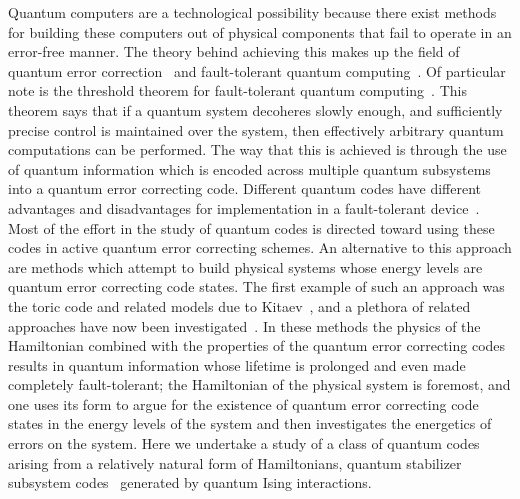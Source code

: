 \documentclass[twocolumn,showpacs,preprintnumbers,amsmath,amssymb,nofootinbib,pra,floatfix]{revtex4-1}
\begin{document}
Quantum computers are a technological possibility because there exist methods for building these computers out of physical components that fail to operate in an error-free manner.  The theory behind achieving this makes up the field of quantum error correction~\cite{Shor:95a,Steane:96a,Steane:96b,Steane:96c,Knill:97a,Gottesman:97a} and fault-tolerant quantum computing~\cite{Shor:96a,Aharonov:97a,Knill:98a,Knill:98b,Preskill:98a,Aliferis:05a}. Of particular note is the threshold theorem for fault-tolerant quantum computing~\cite{Aharonov:97a,Knill:98a,Knill:98b,Aliferis:05a}.  This theorem says that if a quantum system decoheres slowly enough, and sufficiently precise control is maintained over the system, then effectively arbitrary quantum computations can be performed.  The way that this is achieved is through the use of quantum information which is encoded across multiple quantum subsystems into a quantum error correcting code.  Different quantum codes have different advantages and disadvantages for implementation in a fault-tolerant device~\cite{Cross:07a}.  Most of the effort in the study of quantum codes is directed toward using these codes in active quantum error correcting schemes.  An alternative to this approach are methods which attempt to build physical systems whose energy levels are quantum error correcting code states.  The first example of such an approach was the toric code and related models due to Kitaev~\cite{Kitaev:97c,Kitaev:03a}, and a plethora of related approaches have now been investigated~\cite{Barnes:00a,Bacon:01b,Jordan:05a,Weinstein:05b,Bacon:06a,Bacon:08b,Nayak:08a,Bombin:09a,Chesi:10a}. In these methods the physics of the Hamiltonian combined with the properties of the quantum error correcting codes results in quantum information whose lifetime is prolonged and even made completely fault-tolerant; the Hamiltonian of the physical system is foremost, and one uses its form to argue for the existence of quantum error correcting code states in the energy levels of the system and then investigates the energetics of errors on the system.  Here we undertake a study of a class of quantum codes arising from a relatively natural form of Hamiltonians, quantum stabilizer subsystem codes~\cite{Poulin:05a,Kribs:05a,Kribs:05b,Kribs:06a} generated by quantum Ising interactions.
\end{document}
